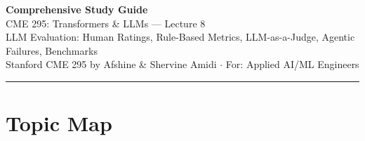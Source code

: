\documentclass[11pt, a4paper]{article}
\begin{document}
\begin{center}
{\LARGE\bfseries\color{defblue} Comprehensive Study Guide}\\[6pt]
{\Large CME 295: Transformers \& LLMs --- Lecture 8}\\[4pt]
{\normalsize LLM Evaluation: Human Ratings, Rule-Based Metrics, LLM-as-a-Judge, Agentic Failures, Benchmarks}\\[4pt]
{\small Stanford CME 295 by Afshine \& Shervine Amidi $\cdot$ For: Applied AI/ML Engineers}\\[2pt]
\rule{\textwidth}{0.4pt}
\end{center}

\tableofcontents
\newpage

\section{Topic Map}
\end{document}

